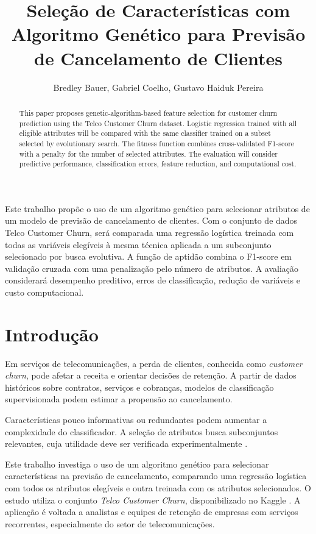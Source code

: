 \documentclass[12pt]{article}
\title{Seleção de Características com Algoritmo Genético para Previsão de Cancelamento de Clientes}
\author{Bredley Bauer\inst{1}, Gabriel Coelho\inst{1}, Gustavo Haiduk Pereira\inst{1}}
\begin{document}
\maketitle

\begin{abstract}
  This paper proposes genetic-algorithm-based feature selection for customer
  churn prediction using the Telco Customer Churn dataset. Logistic regression
  trained with all eligible attributes will be compared with the same
  classifier trained on a subset selected by evolutionary search. The fitness
  function combines cross-validated F1-score with a penalty for the number of
  selected attributes. The evaluation will consider predictive performance,
  classification errors, feature reduction, and computational cost.
\end{abstract}

\begin{resumo}
  Este trabalho propõe o uso de um algoritmo genético para selecionar atributos
  de um modelo de previsão de cancelamento de clientes. Com o conjunto de dados
  Telco Customer Churn, será comparada uma regressão logística treinada com
  todas as variáveis elegíveis à mesma técnica aplicada a um subconjunto
  selecionado por busca evolutiva. A função de aptidão combina o F1-score em
  validação cruzada com uma penalização pelo número de atributos. A avaliação
  considerará desempenho preditivo, erros de classificação, redução de
  variáveis e custo computacional.
\end{resumo}

\section{Introdução}

Em serviços de telecomunicações, a perda de clientes, conhecida como
\textit{customer churn}, pode afetar a receita e orientar decisões de retenção.
A partir de dados históricos sobre contratos, serviços e cobranças, modelos
de classificação supervisionada podem estimar a propensão ao cancelamento.

Características pouco informativas ou redundantes podem aumentar a
complexidade do classificador. A seleção de atributos busca subconjuntos
relevantes, cuja utilidade deve ser verificada experimentalmente
\cite{guyon2003feature}.

Este trabalho investiga o uso de um algoritmo genético para selecionar
características na previsão de cancelamento, comparando uma regressão logística
com todos os atributos elegíveis e outra treinada com os atributos selecionados.
O estudo utiliza o conjunto \textit{Telco Customer Churn}, disponibilizado no
Kaggle \cite{blastchartelco}. A aplicação é voltada a analistas e equipes
de retenção de empresas com serviços recorrentes, especialmente do setor de
telecomunicações.
\end{document}
